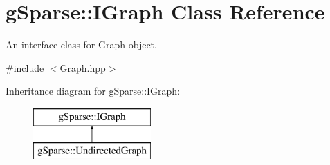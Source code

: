 \hypertarget{classg_sparse_1_1_i_graph}{}\section{g\+Sparse\+:\+:I\+Graph Class Reference}
\label{classg_sparse_1_1_i_graph}


An interface class for Graph object.  




{\ttfamily \#include $<$Graph.\+hpp$>$}

Inheritance diagram for g\+Sparse\+:\+:I\+Graph\+:\begin{figure}[H]
\begin{center}
\leavevmode
\includegraphics[height=2.000000cm]{classg_sparse_1_1_i_graph}
\end{center}
\end{figure}
